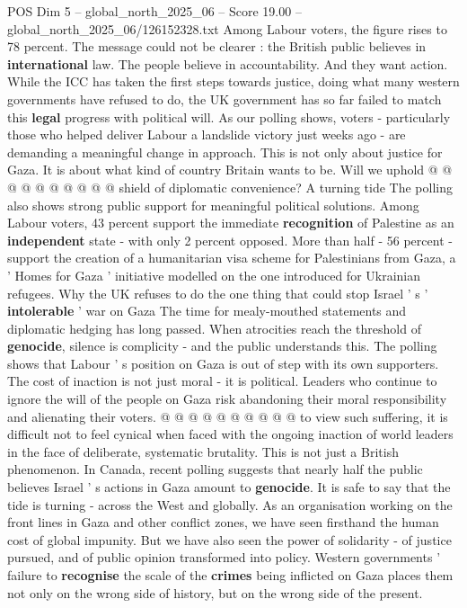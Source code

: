 \begin{textsample}{POS Dim 5 – global\_north\_2025\_06 – Score 19.00 – global\_north\_2025\_06/126152328.txt}
Among Labour voters, the figure rises to 78 percent.
The message could not be clearer : the British public believes in \textbf{international} law.
The people believe in accountability.
And they want action.
While the ICC has taken the first steps towards justice, doing what many western governments have refused to do, the UK government has so far failed to match this \textbf{legal} progress with political will.
As our polling shows, voters - particularly those who helped deliver Labour a landslide victory just weeks ago - are demanding a meaningful change in approach.
This is not only about justice for Gaza.
It is about what kind of country Britain wants to be.
Will we uphold @ @ @ @ @ @ @ @ @ @ shield of diplomatic convenience?
A turning tide The polling also shows strong public support for meaningful political solutions.
Among Labour voters, 43 percent support the immediate \textbf{recognition} of Palestine as an \textbf{independent} state - with only 2 percent opposed.
More than half - 56 percent - support the creation of a humanitarian visa scheme for Palestinians from Gaza, a ' Homes for Gaza ' initiative modelled on the one introduced for Ukrainian refugees.
Why the UK refuses to do the one thing that could stop Israel ' s ' \textbf{intolerable} ' war on Gaza The time for mealy-mouthed statements and diplomatic hedging has long passed.
When atrocities reach the threshold of \textbf{genocide}, silence is complicity - and the public understands this.
The polling shows that Labour ' s position on Gaza is out of step with its own supporters.
The cost of inaction is not just moral - it is political.
Leaders who continue to ignore the will of the people on Gaza risk abandoning their moral responsibility and alienating their voters. @ @ @ @ @ @ @ @ @ @ to view such suffering, it is difficult not to feel cynical when faced with the ongoing inaction of world leaders in the face of deliberate, systematic brutality.
This is not just a British phenomenon.
In Canada, recent polling suggests that nearly half the public believes Israel ' s actions in Gaza amount to \textbf{genocide}.
It is safe to say that the tide is turning - across the West and globally.
As an organisation working on the front lines in Gaza and other conflict zones, we have seen firsthand the human cost of global impunity.
But we have also seen the power of solidarity - of justice pursued, and of public opinion transformed into policy.
Western governments ' failure to \textbf{recognise} the scale of the \textbf{crimes} being inflicted on Gaza places them not only on the wrong side of history, but on the wrong side of the present.

\end{textsample}

